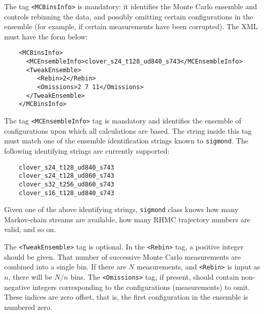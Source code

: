 \documentclass[12pt]{article}
\newcommand{\vb}{\texttt}
\begin{document}
The tag \vb{<MCBinsInfo>} is mandatory: it identifies the Monte Carlo
ensemble and controls rebinning the data, 
and possibly omitting certain configurations in the ensemble (for example,
if certain measurements have been corrupted).  The XML must have the form 
below:
\begin{verbatim}
    <MCBinsInfo>
      <MCEnsembleInfo>clover_s24_t128_ud840_s743</MCEnsembleInfo>
      <TweakEnsemble>
         <Rebin>2</Rebin> 
         <Omissions>2 7 11</Omissions>
      </TweakEnsemble>
    </MCBinsInfo>
\end{verbatim}
The tag \vb{<MCEnsembleInfo>} tag is mandatory and identifies the
ensemble of configurations upon which all calculations are based.
The string inside this tag must match one of the ensemble identification
strings known to \vb{sigmond}.
The following identifying strings are currently supported:
\begin{verbatim}
    clover_s24_t128_ud840_s743
    clover_s24_t128_ud860_s743
    clover_s32_t256_ud860_s743
    clover_s16_t128_ud840_s743
\end{verbatim}
Given one of the above identifying strings, \vb{sigmond} class knows how many 
Markov-chain streams are available, how many RHMC trajectory numbers are 
valid, and so on.

The \vb{<TweakEnsemble>} tag is optional.
In the \vb{<Rebin>} tag, a positive integer should be given.  That number of
successive Monte Carlo measurements are combined into a single bin.
If there are $N$ measurements, and \vb{<Rebin>} is input as $n$,
there will be $N/n$ bins. The \vb{<Omissions>} tag, if present,
should contain non-negative integers corresponding to the configurations
(measurements) to omit. These indices are zero offset, that is, the
first configuration in the ensemble is numbered zero.
\end{document}
